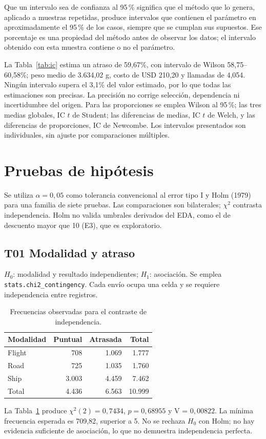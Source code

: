 \documentclass[10pt,a4paper]{article}
\newcommand{\codigo}[1]{{\footnotesize\texttt{#1}}}
\begin{document}
Que un intervalo sea de confianza al 95\,\% significa
que el método que lo genera, aplicado a muestras
repetidas, produce intervalos que contienen el
parámetro en aproximadamente el 95\,\% de los casos,
siempre que se cumplan sus supuestos. Ese porcentaje
es una propiedad del método antes de observar los
datos; el intervalo obtenido con esta muestra
contiene o no el parámetro.

La Tabla~\ref{tab:ic} estima un atraso de 59,67\%, con intervalo de Wilson 58,75--60,58\%; peso medio de 3.634,02 g, costo de USD 210,20 y llamadas de 4,054. 
Ningún intervalo supera el 3,1\% del valor estimado,
por lo que todas las estimaciones son precisas. La precisión no corrige selección, dependencia ni incertidumbre del origen. 
Para las proporciones se emplea Wilson al 95\,\%; las tres medias globales, IC $t$ de Student; las diferencias de medias, IC $t$ de Welch, y las diferencias de proporciones, IC de Newcombe. Los intervalos presentados
son individuales, sin ajuste por comparaciones
múltiples.


\section{Pruebas de hipótesis}
Se utiliza $\alpha=0{,}05$ como tolerancia convencional al error tipo I y Holm (1979) para una familia de siete pruebas. Las comparaciones son bilaterales; $\chi^2$ contrasta independencia. Holm no valida umbrales derivados del EDA, como el de descuento mayor que 10 (E3), que es exploratorio.
\subsection{T01 Modalidad y atraso}
$H_0$: modalidad y resultado independientes; $H_1$: asociación. Se emplea \codigo{stats.chi2\_contingency}. Cada envío ocupa una celda y se requiere independencia entre registros.
\begin{table}[H]\centering\small\caption{Frecuencias observadas para el contraste de independencia.}\label{tab:contingencia}
\begin{tabular}{@{}lrrr@{}}\toprule Modalidad & Puntual & Atrasada & Total\\\midrule
Flight & 708 & 1.069 & 1.777\\Road & 725 & 1.035 & 1.760\\Ship & 3.003 & 4.459 & 7.462\\\midrule
Total & 4.436 & 6.563 & 10.999\\\bottomrule\end{tabular}\end{table}
La Tabla~\ref{tab:contingencia} produce $\chi^2(2)=0{,}7434$, $p=0{,}68955$ y V = $0{,}00822$. La mínima frecuencia esperada es 709,82, superior a 5. No se rechaza $H_0$ con Holm; no hay evidencia suficiente de asociación, lo que no demuestra independencia perfecta.
\end{document}
